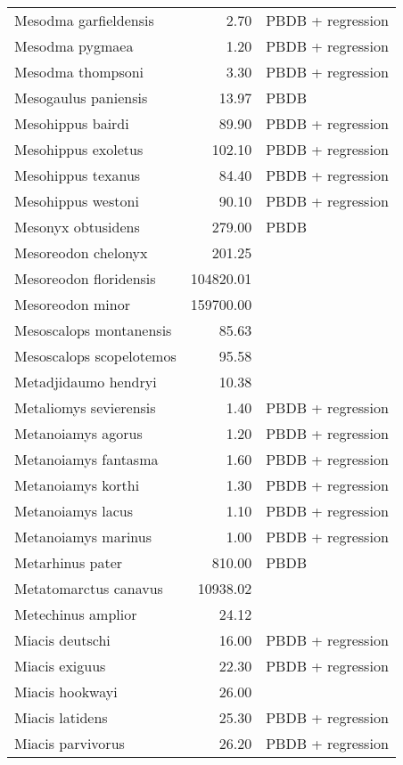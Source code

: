 \begin{table}[ht]
\begin{tabular}{lrl}
  Mesodma garfieldensis & 2.70 & PBDB + regression \\ 
  Mesodma pygmaea & 1.20 & PBDB + regression \\ 
  Mesodma thompsoni & 3.30 & PBDB + regression \\ 
  Mesogaulus paniensis & 13.97 & PBDB \\ 
  Mesohippus bairdi & 89.90 & PBDB + regression \\ 
  Mesohippus exoletus & 102.10 & PBDB + regression \\ 
  Mesohippus texanus & 84.40 & PBDB + regression \\ 
  Mesohippus westoni & 90.10 & PBDB + regression \\ 
  Mesonyx obtusidens & 279.00 & PBDB \\ 
  Mesoreodon chelonyx & 201.25 & \cite{Bever2003} \\ 
  Mesoreodon floridensis & 104820.01 & \cite{Tomiya2013} \\ 
  Mesoreodon minor & 159700.00 & \cite{McKenna2011} \\ 
  Mesoscalops montanensis & 85.63 & \cite{Tomiya2013} \\ 
  Mesoscalops scopelotemos & 95.58 & \cite{Tomiya2013} \\ 
  Metadjidaumo hendryi & 10.38 & \cite{Tomiya2013} \\ 
  Metaliomys sevierensis & 1.40 & PBDB + regression \\ 
  Metanoiamys agorus & 1.20 & PBDB + regression \\ 
  Metanoiamys fantasma & 1.60 & PBDB + regression \\ 
  Metanoiamys korthi & 1.30 & PBDB + regression \\ 
  Metanoiamys lacus & 1.10 & PBDB + regression \\ 
  Metanoiamys marinus & 1.00 & PBDB + regression \\ 
  Metarhinus pater & 810.00 & PBDB \\ 
  Metatomarctus canavus & 10938.02 & \cite{Tomiya2013} \\ 
  Metechinus amplior & 24.12 & \cite{Tedford1994} \\ 
  Miacis deutschi & 16.00 & PBDB + regression \\ 
  Miacis exiguus & 22.30 & PBDB + regression \\ 
  Miacis hookwayi & 26.00 & \cite{Patton1973} \\ 
  Miacis latidens & 25.30 & PBDB + regression \\ 
  Miacis parvivorus & 26.20 & PBDB + regression \\ 

\end{tabular}
\end{table}
